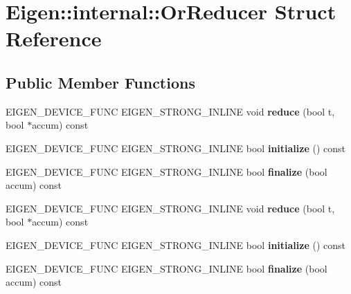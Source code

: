 \hypertarget{struct_eigen_1_1internal_1_1_or_reducer}{}\section{Eigen\+:\+:internal\+:\+:Or\+Reducer Struct Reference}
\label{struct_eigen_1_1internal_1_1_or_reducer}
\subsection*{Public Member Functions}
\begin{DoxyCompactItemize}
\item 
\mbox{\label{struct_eigen_1_1internal_1_1_or_reducer_a37d73ca982ac58f8a3f0c820f0f701f6}} 
E\+I\+G\+E\+N\+\_\+\+D\+E\+V\+I\+C\+E\+\_\+\+F\+U\+NC E\+I\+G\+E\+N\+\_\+\+S\+T\+R\+O\+N\+G\+\_\+\+I\+N\+L\+I\+NE void {\bfseries reduce} (bool t, bool $\ast$accum) const
\item 
\mbox{\label{struct_eigen_1_1internal_1_1_or_reducer_a962a0415af7673cf55e7e94bdcc72dc6}} 
E\+I\+G\+E\+N\+\_\+\+D\+E\+V\+I\+C\+E\+\_\+\+F\+U\+NC E\+I\+G\+E\+N\+\_\+\+S\+T\+R\+O\+N\+G\+\_\+\+I\+N\+L\+I\+NE bool {\bfseries initialize} () const
\item 
\mbox{\label{struct_eigen_1_1internal_1_1_or_reducer_a3f857cf6a887104cf90f060ae9f7efb1}} 
E\+I\+G\+E\+N\+\_\+\+D\+E\+V\+I\+C\+E\+\_\+\+F\+U\+NC E\+I\+G\+E\+N\+\_\+\+S\+T\+R\+O\+N\+G\+\_\+\+I\+N\+L\+I\+NE bool {\bfseries finalize} (bool accum) const
\item 
\mbox{\label{struct_eigen_1_1internal_1_1_or_reducer_a37d73ca982ac58f8a3f0c820f0f701f6}} 
E\+I\+G\+E\+N\+\_\+\+D\+E\+V\+I\+C\+E\+\_\+\+F\+U\+NC E\+I\+G\+E\+N\+\_\+\+S\+T\+R\+O\+N\+G\+\_\+\+I\+N\+L\+I\+NE void {\bfseries reduce} (bool t, bool $\ast$accum) const
\item 
\mbox{\label{struct_eigen_1_1internal_1_1_or_reducer_a962a0415af7673cf55e7e94bdcc72dc6}} 
E\+I\+G\+E\+N\+\_\+\+D\+E\+V\+I\+C\+E\+\_\+\+F\+U\+NC E\+I\+G\+E\+N\+\_\+\+S\+T\+R\+O\+N\+G\+\_\+\+I\+N\+L\+I\+NE bool {\bfseries initialize} () const
\item 
\mbox{\label{struct_eigen_1_1internal_1_1_or_reducer_a3f857cf6a887104cf90f060ae9f7efb1}} 
E\+I\+G\+E\+N\+\_\+\+D\+E\+V\+I\+C\+E\+\_\+\+F\+U\+NC E\+I\+G\+E\+N\+\_\+\+S\+T\+R\+O\+N\+G\+\_\+\+I\+N\+L\+I\+NE bool {\bfseries finalize} (bool accum) const
\end{DoxyCompactItemize}
